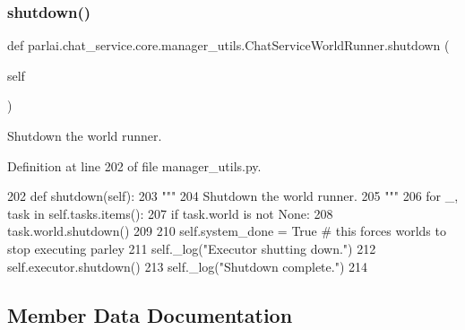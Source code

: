 \subsubsection{\texorpdfstring{shutdown()}{shutdown()}}
{\footnotesize\ttfamily def parlai.\+chat\+\_\+service.\+core.\+manager\+\_\+utils.\+Chat\+Service\+World\+Runner.\+shutdown (\begin{DoxyParamCaption}\item[{}]{self }\end{DoxyParamCaption})}

\begin{DoxyVerb}Shutdown the world runner.
\end{DoxyVerb}
 

Definition at line 202 of file manager\+\_\+utils.\+py.


\begin{DoxyCode}
202     \textcolor{keyword}{def }shutdown(self):
203         \textcolor{stringliteral}{"""}
204 \textcolor{stringliteral}{        Shutdown the world runner.}
205 \textcolor{stringliteral}{        """}
206         \textcolor{keywordflow}{for} \_, task \textcolor{keywordflow}{in} self.tasks.items():
207             \textcolor{keywordflow}{if} task.world \textcolor{keywordflow}{is} \textcolor{keywordflow}{not} \textcolor{keywordtype}{None}:
208                 task.world.shutdown()
209 
210         self.system\_done = \textcolor{keyword}{True}  \textcolor{comment}{# this forces worlds to stop executing parley}
211         self.\_log(\textcolor{stringliteral}{"Executor shutting down."})
212         self.executor.shutdown()
213         self.\_log(\textcolor{stringliteral}{"Shutdown complete."})
214 
\end{DoxyCode}


\subsection{Member Data Documentation}
\mbox{\label{classparlai_1_1chat__service_1_1core_1_1manager__utils_1_1ChatServiceWorldRunner_af71184b9bb3dc433adfd678b7a8097e7}} 
